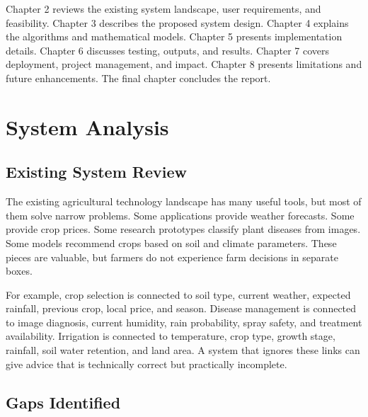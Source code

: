 \documentclass[12pt,a4paper]{report}
\begin{document}
Chapter 2 reviews the existing system landscape, user requirements, and feasibility. Chapter 3 describes the proposed system design. Chapter 4 explains the algorithms and mathematical models. Chapter 5 presents implementation details. Chapter 6 discusses testing, outputs, and results. Chapter 7 covers deployment, project management, and impact. Chapter 8 presents limitations and future enhancements. The final chapter concludes the report.

\singlespacing

\chapter{System Analysis}
\doublespacing

\section{Existing System Review}

The existing agricultural technology landscape has many useful tools, but most of them solve narrow problems. Some applications provide weather forecasts. Some provide crop prices. Some research prototypes classify plant diseases from images. Some models recommend crops based on soil and climate parameters. These pieces are valuable, but farmers do not experience farm decisions in separate boxes.

For example, crop selection is connected to soil type, current weather, expected rainfall, previous crop, local price, and season. Disease management is connected to image diagnosis, current humidity, rain probability, spray safety, and treatment availability. Irrigation is connected to temperature, crop type, growth stage, rainfall, soil water retention, and land area. A system that ignores these links can give advice that is technically correct but practically incomplete.

\section{Gaps Identified}
\end{document}
